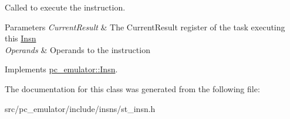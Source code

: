 Called to execute the instruction. 


\begin{DoxyParams}{Parameters}
{\em Current\+Result} & The Current\+Result register of the task executing this \hyperlink{classpc__emulator_1_1Insn}{Insn} \\
\hline
{\em Operands} & Operands to the instruction \\
\hline
\end{DoxyParams}


Implements \hyperlink{classpc__emulator_1_1Insn_a103d27030e872a799e313df16c1f3d66}{pc\+\_\+emulator\+::\+Insn}.



The documentation for this class was generated from the following file\+:\begin{DoxyCompactItemize}
\item 
src/pc\+\_\+emulator/include/insns/st\+\_\+insn.\+h\end{DoxyCompactItemize}
